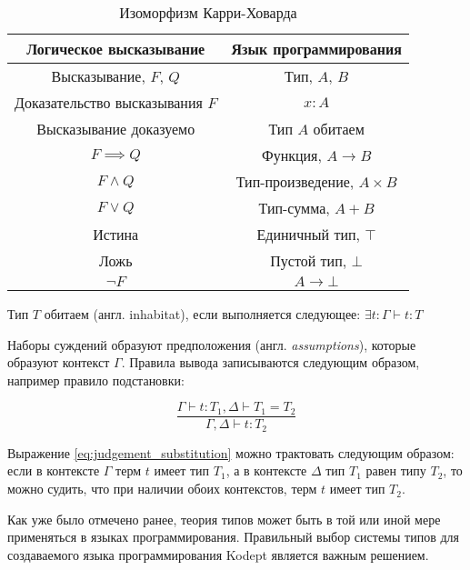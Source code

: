 \begin{table}[h]
    \centering
    \caption{Изоморфизм Карри-Ховарда}
    \label{tab:curry-hovard-iso}
    \begin{tabular}{|c|c|}
        \hline
        \textbf{Логическое высказывание} & \textbf{Язык программирования} \\\hline
        Высказывание, $F$, $Q$           & Тип, $A$, $B$                  \\\hline
        Доказательство высказывания $F$  & $x: A$                         \\\hline
        Высказывание доказуемо           & Тип $A$ обитаем                \\\hline
        $F \implies Q$                   & Функция, $A \to B$             \\\hline
        $F \wedge Q$                     & Тип-произведение, $A \times B$ \\\hline
        $F \vee Q$                       & Тип-сумма, $A + B$             \\\hline
        Истина                           & Единичный тип, $\top$          \\\hline
        Ложь                             & Пустой тип, $\bot$             \\\hline
        $\neg F$                         & $A \to \bot$                   \\\hline
    \end{tabular}
\end{table}

Тип $T$ обитаем (англ. inhabitat), если выполняется следующее: $\exists t: \Gamma \vdash t: T$

Наборы суждений образуют предположения (англ. \textit{assumptions}), которые образуют контекст $\Gamma$.
Правила вывода записываются следующим образом, например правило подстановки:

\begin{equation}
    \label{eq:judgement_substitution}
    \frac{\Gamma \vdash t: T_1, \Delta \vdash T_1 = T_2}{\Gamma, \Delta \vdash t: T_2}
\end{equation}

Выражение \ref{eq:judgement_substitution} можно трактовать следующим образом: если в контексте $\Gamma$ терм $t$ имеет тип $T_1$, а в контексте $\Delta$ тип $T_1$ равен типу $T_2$, то можно судить, что при наличии обоих контекстов, терм $t$ имеет тип $T_2$.

Как уже было отмечено ранее, теория типов может быть в той или иной мере применяться в языках программирования.
Правильный выбор системы типов для создаваемого языка программирования Kodept является важным решением.


